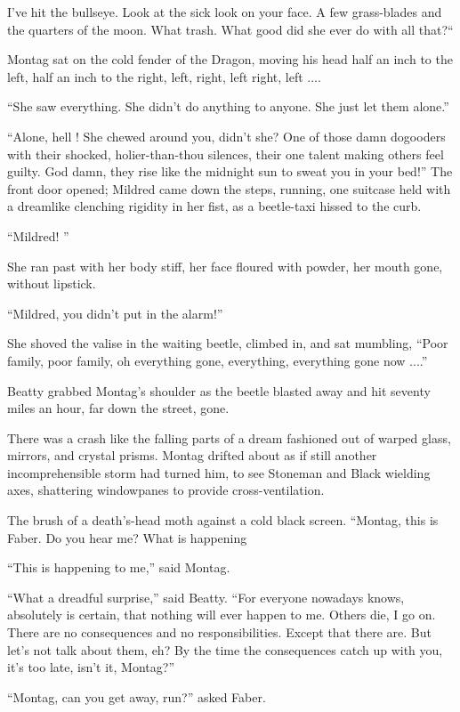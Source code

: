 \documentclass[11pt,openany]{book}
\begin{document}
I've hit the bullseye. Look at the sick look on your face. A few grass-blades and the quarters of the moon. What trash. What good did she ever do with all that?``

Montag sat on the cold fender of the Dragon, moving his head half an inch to the left, half an inch to the right, left, right, left right, left ....

``She saw everything. She didn't do anything to anyone. She just let them alone.''

``Alone, hell ! She chewed around you, didn't she? One of those damn dogooders with their shocked, holier-than-thou silences, their one talent making others feel guilty. God damn, they rise like the midnight sun to sweat you in your bed!'' The front door opened; Mildred came down the steps, running, one suitcase held with a dreamlike clenching rigidity in her fist, as a beetle-taxi hissed to the curb.

``Mildred! ''

She ran past with her body stiff, her face floured with powder, her mouth gone, without lipstick.

``Mildred, you didn't put in the alarm!''

She shoved the valise in the waiting beetle, climbed in, and sat mumbling, ``Poor family, poor family, oh everything gone, everything, everything gone now ....''

Beatty grabbed Montag's shoulder as the beetle blasted away and hit seventy miles an hour, far down the street, gone.

There was a crash like the falling parts of a dream fashioned out of warped glass, mirrors, and crystal prisms. Montag drifted about as if still another incomprehensible storm had turned him, to see Stoneman and Black wielding axes, shattering windowpanes to provide cross-ventilation.

The brush of a death's-head moth against a cold black screen. ``Montag, this is Faber. Do you hear me? What is happening

``This is happening to me,'' said Montag.

``What a dreadful surprise,'' said Beatty. ``For everyone nowadays knows, absolutely is certain, that nothing will ever happen to me. Others die, I go on. There are no consequences and no responsibilities. Except that there are. But let's not talk about them, eh? By the time the consequences catch up with you, it's too late, isn't it, Montag?''

``Montag, can you get away, run?'' asked Faber.
\end{document}
